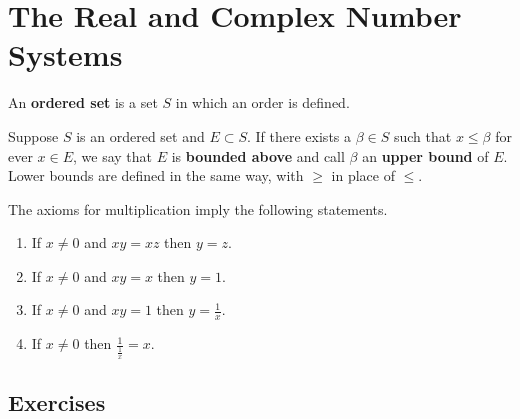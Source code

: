 \chapter{The Real and Complex Number Systems}
\setcounter{theorem}{5}
\begin{definition}
	\label{definition-1.6}
	An \textbf{ordered set} is a set $S$ in which an order is defined.
\end{definition}

\begin{definition}
	\label{definition-1.7}
	Suppose $S$ is an ordered set and $E \subset S$. If there exists a $\beta \in S$ such that $x \leq \beta$ for ever $x \in E$, we say that $E$ is \textbf{bounded above} and call $\beta$ an \textbf{upper bound} of $E$.
	\newline\newline
	Lower bounds are defined in the same way, with $\geq$ in place of $\leq$.
\end{definition}

\setcounter{theorem}{14}
\begin{pproposition}
	\label{pproposition-1.15}
	The axioms for multiplication imply the following statements.
	\renewcommand{\labelenumi}{(\alph{enumi})}
	\begin{enumerate}
		\item If $x \neq 0$ and $xy = xz$ then $y = z$.
		\item If $x \neq 0$ and $xy = x$ then $y = 1$.
		\item If $x \neq 0$ and $xy = 1$ then $y = \frac{1}{x}$.
		\item If $x \neq 0$ then $\frac{1}{\frac{1}{x}} = x$.
	\end{enumerate}
\end{pproposition}

\section{Exercises}





\setcounter{exercise}{17}

